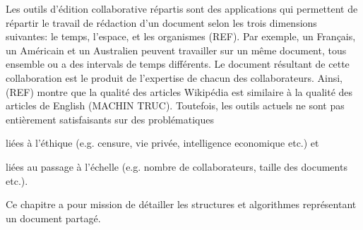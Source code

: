 
Les outils d'édition collaborative répartis sont des applications qui
permettent de répartir le travail de rédaction d'un document selon les trois
dimensions suivantes: le temps, l'espace, et les organismes (REF). Par exemple,
un Français, un Américain et un Australien peuvent travailler sur un même
document, tous ensemble ou a des intervals de temps différents.  Le document
résultant de cette collaboration est le produit de l'expertise de chacun des
collaborateurs. Ainsi, (REF) montre que la qualité des articles Wikipédia est
similaire à la qualité des articles de English (MACHIN TRUC). Toutefois, les
outils actuels ne sont pas entièrement satisfaisants sur des problématiques
\begin{inparaenum}[(i)]
\item liées à l'éthique (e.g. censure, vie privée, intelligence economique
  etc.) et
\item liées au passage à l'échelle (e.g. nombre de collaborateurs, taille des
  documents etc.).
\end{inparaenum}
Ce chapitre a pour mission de détailler les structures et algorithmes
représentant un document partagé.
